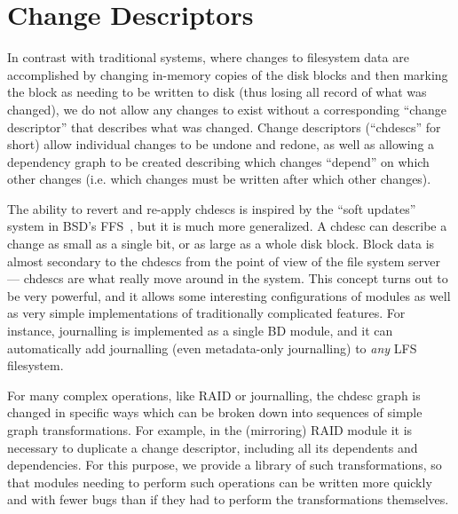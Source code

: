\section{Change Descriptors}
\label{sec:chdescs}

In contrast with traditional systems, where changes to filesystem data are
accomplished by changing in-memory copies of the disk blocks and then marking
the block as needing to be written to disk (thus losing all record of what was
changed), we do not allow any changes to exist without a corresponding ``change
descriptor'' that describes what was changed. Change descriptors (``chdescs''
for short) allow individual changes to be undone and redone, as well as allowing
a dependency graph to be created describing which changes ``depend'' on which
other changes (i.e. which changes must be written after which other changes).

The ability to revert and re-apply chdescs is inspired by the ``soft updates''
system in BSD's FFS~\cite{ganger00soft}, but it is much more generalized. A chdesc can describe a
change as small as a single bit, or as large as a whole disk block. Block data
is almost secondary to the chdescs from the point of view of the file system
server --- chdescs are what really move around in the system. This concept turns
out to be very powerful, and it allows some interesting configurations of
modules as well as very simple implementations of traditionally complicated
features. For instance, journalling is implemented as a single BD module, and it
can automatically add journalling (even metadata-only journalling) to {\it any}
LFS filesystem.

For many complex operations, like RAID or journalling, the chdesc graph is
changed in specific ways which can be broken down into sequences of simple graph
transformations. For example, in the (mirroring) RAID module it is necessary to
duplicate a change descriptor, including all its dependents and dependencies.
For this purpose, we provide a library of such transformations, so that modules
needing to perform such operations can be written more quickly and with fewer
bugs than if they had to perform the transformations themselves.
